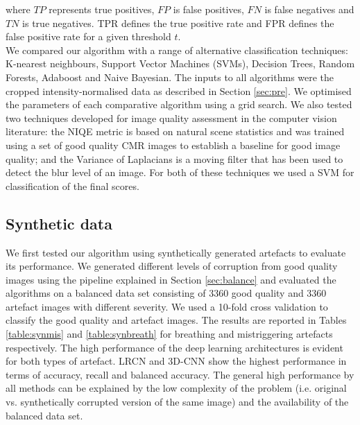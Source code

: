 \documentclass[preprint,12pt,authoryear]{elsarticle}
\begin{document}
where $TP$ represents true positives, $FP$ is false positives, $FN$ is false negatives and $TN$ is true negatives. TPR defines the true positive rate and FPR defines the false positive rate for a given threshold $t$.\\

We compared our algorithm with a range of alternative classification techniques: K-nearest neighbours, Support Vector Machines (SVMs), Decision Trees, Random Forests, Adaboost  and  Naive Bayesian. The inputs to all algorithms were the cropped intensity-normalised data as described in Section \ref{sec:pre}. We optimised the parameters of each comparative algorithm using a grid search. We also tested two techniques developed for image quality assessment in the computer vision literature: the NIQE metric \citep{Mittal2013} is based on natural scene statistics and was trained using a set of good quality CMR images to establish a baseline for good image quality; and the Variance of Laplacians is a moving filter that has been used to detect the blur level of an image. For both of these techniques we used a SVM for classification of the final scores.

\subsection{Synthetic data}
\label{sec:SyntheticResults}

We first tested our algorithm using synthetically generated artefacts to evaluate its performance. We generated different levels of corruption from good quality images using the pipeline explained in Section \ref{sec:balance} and evaluated the algorithms on a balanced data set consisting of 3360 good quality and 3360 artefact images with different severity. We used a  10-fold cross validation to classify the good quality and artefact images. The results are reported in Tables \ref{table:synmis} and \ref{table:synbreath}  for breathing and mistriggering artefacts respectively.  The high performance of the deep learning architectures is evident for both types of artefact. 
LRCN and 3D-CNN show the highest performance in terms of accuracy, recall and balanced accuracy. The general high performance by all methods can be explained by the low complexity of the problem (i.e. original vs. synthetically corrupted version of the same image) and the availability of the balanced data set.
\end{document}
